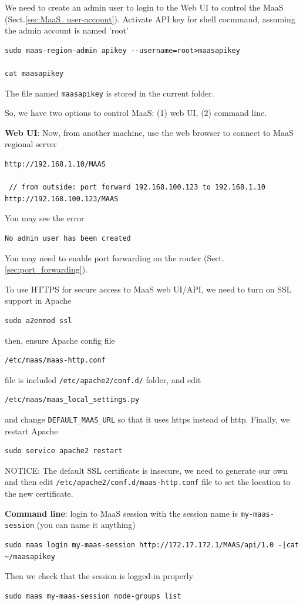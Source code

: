 We need to create an admin user to login to the Web UI to control the MaaS
(Sect.\ref{sec:MaaS_user-account}). Activate API key for shell cocmmand,
assuming the admin account is named 'root'
\begin{verbatim}
sudo maas-region-admin apikey --username=root>maasapikey

cat maasapikey
\end{verbatim}
The file named \verb!maasapikey! is stored in the current folder.

So, we have two options to control MaaS: (1) web UI, (2) command line.

{\bf Web UI}: Now, from another machine, use the web browser to connect to MaaS regional
server
\begin{verbatim}
http://192.168.1.10/MAAS
 
 // from outside: port forward 192.168.100.123 to 192.168.1.10
http://192.168.100.123/MAAS
\end{verbatim}
You may see the error
\begin{verbatim}
No admin user has been created
\end{verbatim}
You may need to enable port forwarding on the router
(Sect.\ref{sec:port_forwarding}).

To use HTTPS for secure access to MaaS web UI/API, we need to turn on SSL
support in Apache
\begin{verbatim}
sudo a2enmod ssl
\end{verbatim}
then, ensure Apache config file 
\begin{verbatim}
/etc/maas/maas-http.conf
\end{verbatim}
file is included \verb!/etc/apache2/conf.d/! folder, and edit
\begin{verbatim}
/etc/maas/maas_local_settings.py
\end{verbatim}
and change \verb!DEFAULT_MAAS_URL! so that it uses https instead of http.
Finally, we restart Apache
\begin{verbatim} 
sudo service apache2 restart
\end{verbatim}
NOTICE: The default SSL certificate is insecure, we need to generate our own and
then edit \verb!/etc/apache2/conf.d/maas-http.conf! file to set the location to
the new certificate.



{\bf Command line}: login to MaaS session with the session name is
\verb!my-maas-session! (you can name it anything)
\begin{verbatim}
sudo maas login my-maas-session http://172.17.172.1/MAAS/api/1.0 -|cat ~/maasapikey
\end{verbatim}
Then we check that the session is logged-in properly
\begin{verbatim}
sudo maas my-maas-session node-groups list
\end{verbatim}


